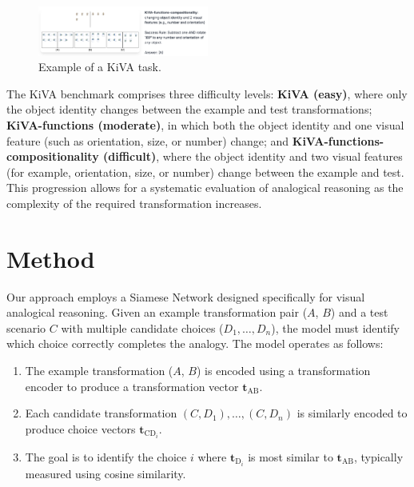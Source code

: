 \documentclass[twocolumn]{article} %
\begin{document}
\begin{figure}[h]\vspace{-0.5\baselineskip}
    \centering
    \includegraphics[width=0.5\textwidth]{figures/kiva-example.png}
    \caption{Example of a KiVA task.}
    \label{fig:kiva_example}
\end{figure}\vspace{-0.5\baselineskip}

The KiVA benchmark comprises three difficulty levels: \textbf{KiVA (easy)}, where only the object identity changes between the example and test transformations; \textbf{KiVA-functions (moderate)}, in which both the object identity and one visual feature (such as orientation, size, or number) change; and \textbf{KiVA-functions-compositionality (difficult)}, where the object identity and two visual features (for example, orientation, size, or number) change between the example and test. This progression allows for a systematic evaluation of analogical reasoning as the complexity of the required transformation increases.

\section{Method}

Our approach employs a Siamese Network \cite{Chicco2021SiameseOverview} designed specifically for visual analogical reasoning. Given an example transformation pair ($A$, $B$) and a test scenario $C$ with multiple candidate choices ($D_1, \dots, D_n$), the model must identify which choice correctly completes the analogy. The model operates as follows:
\begin{enumerate}
    \item The example transformation ($A$, $B$) is encoded using a transformation encoder to produce a transformation vector $\mathbf{t}_{\mathrm{AB}}$.
    \item Each candidate transformation $(C, D_1), \ldots, (C, D_n)$ is similarly encoded to produce choice vectors $\mathbf{t}_{\mathrm{CD}_i}$.
    \item The goal is to identify the choice $i$ where $\mathbf{t}_{\mathrm{D}_i}$ is most similar to $\mathbf{t}_{\mathrm{AB}}$, typically measured using cosine similarity.
\end{enumerate}
\end{document}
